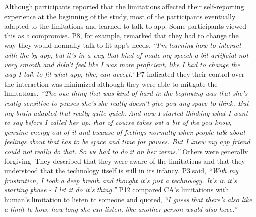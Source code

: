         Although participants reported that the limitations affected their self-reporting experience at the beginning of the study, most of the participants eventually adapted to the limitations and learned to talk to \acl{app}. 
        Some participants viewed this as a compromise.
        P8, for example, remarked that they had to change the way they would normally talk to fit \acl{app}'s needs.
                \textit{``I'm learning how to interact with the by \acl{app}, but it's in a way that kind of made my speech a bit artificial not very smooth and didn't feel like I was more proficient, like I had to change the way I talk to fit what \acl{app}, like, can accept.'}
        P7 indicated they their control over the interaction was minimized although they were able to mitigate the limitations.
                \textit{``The one thing that was kind of hard in the beginning was that she's really sensitive to pauses she's she really doesn't give you any space to think. But my brain adapted that really quite quick. 
                And now I started thinking what I want to say before I called her up. that of course takes out a bit of the you know, genuine energy out of it and because of feelings normally when people talk about feelings about that has to be space and time for pauses. But I knew my \acl{app} friend could not really do that. 
                So we had to do it on her terms.''}
        Others were generally forgiving. They described that they were aware of the limitations and that they understood that the technology itself is still in its infancy. P3 said,
                \textit{
                ``With my frustration, I took a deep breath and thought it’s just a technology. It’s in it’s starting phase - I let it do it’s thing.''
                }
        P12 compared \ac{CA}'s limitations with human's limitation to listen to someone and quoted,
                \textit{
                ``I guess that there's also like a limit to how, how long she can listen, like another person would also have.''
                }


